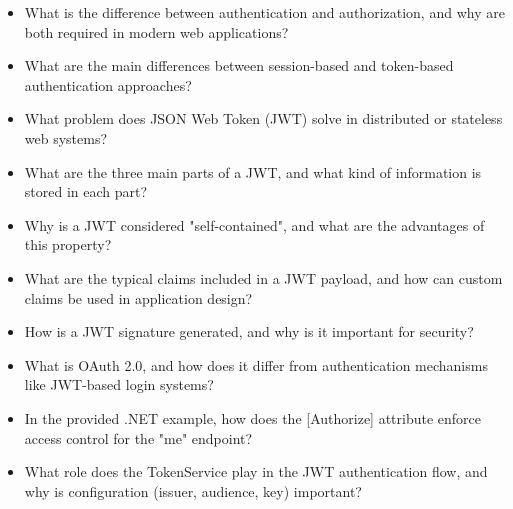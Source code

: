 \begin{itemize}
    \item What is the difference between authentication and authorization, and why are both required in modern web applications?

    \item What are the main differences between session-based and token-based authentication approaches?

    \item What problem does JSON Web Token (JWT) solve in distributed or stateless web systems?

    \item What are the three main parts of a JWT, and what kind of information is stored in each part?

    \item Why is a JWT considered "self-contained", and what are the advantages of this property?

    \item What are the typical claims included in a JWT payload, and how can custom claims be used in application design?

    \item How is a JWT signature generated, and why is it important for security?

    \item What is OAuth 2.0, and how does it differ from authentication mechanisms like JWT-based login systems?

    \item In the provided .NET example, how does the [Authorize] attribute enforce access control for the "me" endpoint?

    \item What role does the TokenService play in the JWT authentication flow, and why is configuration (issuer, audience, key) important?
\end{itemize}
